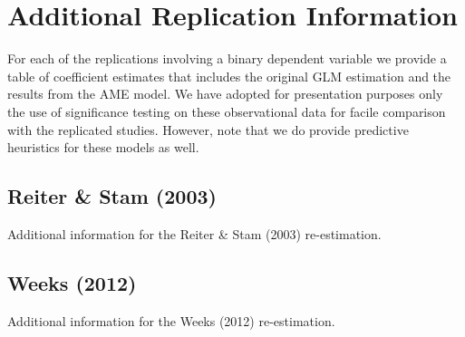 \section{Additional Replication Information}

For each of the replications involving a binary dependent variable we provide a table of coefficient estimates that includes the original GLM estimation and the results from the AME model.  We have adopted for presentation purposes only the use of significance testing on these observational data for facile comparison with the replicated studies.  However, note that we do provide predictive heuristics for these models as well.


\clearpage
\subsection*{Reiter \& Stam (2003)}

Additional information for the Reiter \& Stam (2003) re-estimation. 


\FloatBarrier

\FloatBarrier
\clearpage

\subsection*{Weeks (2012)}

Additional information for the Weeks (2012) re-estimation. 


\FloatBarrier

\FloatBarrier
\clearpage

